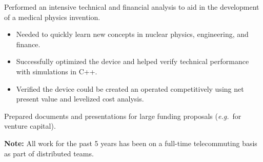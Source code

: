 \documentclass[]{deedy-resume-openfont}
\begin{document}
\begin{minipage}[t]{0.66\textwidth}
\sectionsep
{}
\begin{tightemize}
\item Performed an intensive technical and financial analysis to aid in the development of a medical physics invention.
  \begin{itemize}
  \item Needed to quickly learn new concepts in nuclear physics, engineering, and finance.
  \item Successfully optimized the device and helped verify technical performance with simulations in C++.
  \item Verified the device could be created an operated competitively using net present value and levelized cost analysis.
  \end{itemize}
\item Prepared documents and presentations for large funding proposals (\emph{e.g.}~for venture capital).
\end{tightemize}
\sectionsep

\textbf{Note:} All work for the past 5 years has been on a full-time telecommuting basis as part of distributed teams.

\end{minipage}
\end{document}
